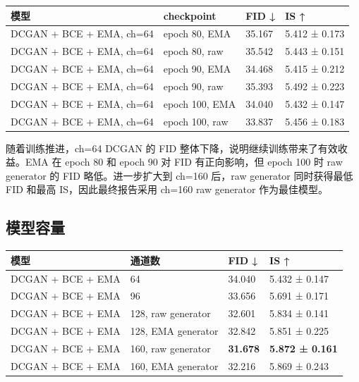 \documentclass[UTF8,a4paper,12pt]{ctexart}
\begin{document}
\begin{table}[H]
\centering
\small
\begin{tabularx}{\linewidth}{lXXX}
\toprule
模型 & checkpoint & FID ↓ & IS ↑ \\
\midrule
DCGAN + BCE + EMA, ch=64 & epoch 80, EMA & 35.167 & 5.412 ± 0.173 \\
DCGAN + BCE + EMA, ch=64 & epoch 80, raw & 35.542 & 5.443 ± 0.151 \\
DCGAN + BCE + EMA, ch=64 & epoch 90, EMA & 34.468 & 5.415 ± 0.212 \\
DCGAN + BCE + EMA, ch=64 & epoch 90, raw & 35.393 & 5.492 ± 0.223 \\
DCGAN + BCE + EMA, ch=64 & epoch 100, EMA & 34.040 & 5.432 ± 0.147 \\
DCGAN + BCE + EMA, ch=64 & epoch 100, raw & 33.837 & 5.456 ± 0.183 \\
\bottomrule
\end{tabularx}
\end{table}


随着训练推进，ch=64 DCGAN 的 FID 整体下降，说明继续训练带来了有效收益。EMA 在 epoch 80 和 epoch 90 对 FID 有正向影响，但 epoch 100 时 raw generator 的 FID 略低。进一步扩大到 ch=160 后，raw generator 同时获得最低 FID 和最高 IS，因此最终报告采用 ch=160 raw generator 作为最佳模型。


\subsection{模型容量}

\begin{table}[H]
\centering
\small
\begin{tabularx}{\linewidth}{lXXX}
\toprule
模型 & 通道数 & FID ↓ & IS ↑ \\
\midrule
DCGAN + BCE + EMA & 64 & 34.040 & 5.432 ± 0.147 \\
DCGAN + BCE + EMA & 96 & 33.656 & 5.691 ± 0.171 \\
DCGAN + BCE + EMA & 128, raw generator & 32.601 & 5.834 ± 0.141 \\
DCGAN + BCE + EMA & 128, EMA generator & 32.842 & 5.851 ± 0.225 \\
DCGAN + BCE + EMA & 160, raw generator & \textbf{31.678} & \textbf{5.872 ± 0.161} \\
DCGAN + BCE + EMA & 160, EMA generator & 32.216 & 5.869 ± 0.243 \\
\bottomrule
\end{tabularx}
\end{table}
\end{document}

